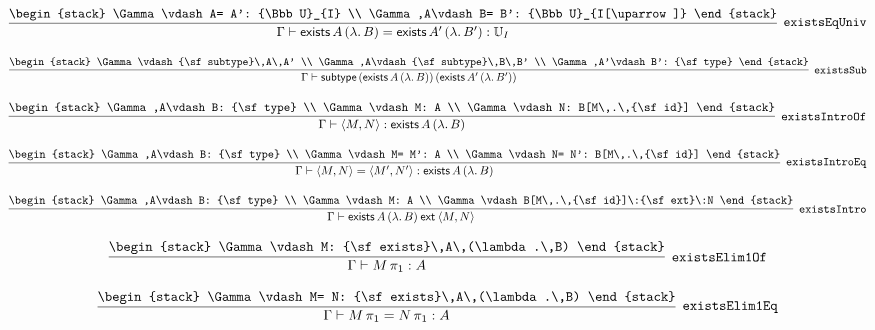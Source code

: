 \[
\infer[{\tt existsEqUniv}]{\Gamma \vdash {\sf exists}\,A\,(\lambda .\,B)= {\sf exists}\,A'\,(\lambda .\,B'): {\Bbb U}_{I}}{
\begin{stack}
\Gamma \vdash A= A': {\Bbb U}_{I}
\\
\Gamma ,A\vdash B= B': {\Bbb U}_{I[\uparrow ]}
\end{stack}}
\]

\[
\infer[{\tt existsSub}]{\Gamma \vdash {\sf subtype}\,({\sf exists}\,A\,(\lambda .\,B))\,({\sf exists}\,A'\,(\lambda .\,B'))}{
\begin{stack}
\Gamma \vdash {\sf subtype}\,A\,A'
\\
\Gamma ,A\vdash {\sf subtype}\,B\,B'
\\
\Gamma ,A'\vdash B': {\sf type}
\end{stack}}
\]

\[
\infer[{\tt existsIntroOf}]{\Gamma \vdash \langle M,N\rangle : {\sf exists}\,A\,(\lambda .\,B)}{
\begin{stack}
\Gamma ,A\vdash B: {\sf type}
\\
\Gamma \vdash M: A
\\
\Gamma \vdash N: B[M\,.\,{\sf id}]
\end{stack}}
\]

\[
\infer[{\tt existsIntroEq}]{\Gamma \vdash \langle M,N\rangle = \langle M',N'\rangle : {\sf exists}\,A\,(\lambda .\,B)}{
\begin{stack}
\Gamma ,A\vdash B: {\sf type}
\\
\Gamma \vdash M= M': A
\\
\Gamma \vdash N= N': B[M\,.\,{\sf id}]
\end{stack}}
\]

\[
\infer[{\tt existsIntro}]{\Gamma \vdash {\sf exists}\,A\,(\lambda .\,B)\:{\sf ext}\:\langle M,N\rangle }{
\begin{stack}
\Gamma ,A\vdash B: {\sf type}
\\
\Gamma \vdash M: A
\\
\Gamma \vdash B[M\,.\,{\sf id}]\:{\sf ext}\:N
\end{stack}}
\]

\[
\infer[{\tt existsElim1Of}]{\Gamma \vdash M\, \pi_1: A}{
\begin{stack}
\Gamma \vdash M: {\sf exists}\,A\,(\lambda .\,B)
\end{stack}}
\]

\[
\infer[{\tt existsElim1Eq}]{\Gamma \vdash M\, \pi_1= N\, \pi_1: A}{
\begin{stack}
\Gamma \vdash M= N: {\sf exists}\,A\,(\lambda .\,B)
\end{stack}}
\]

